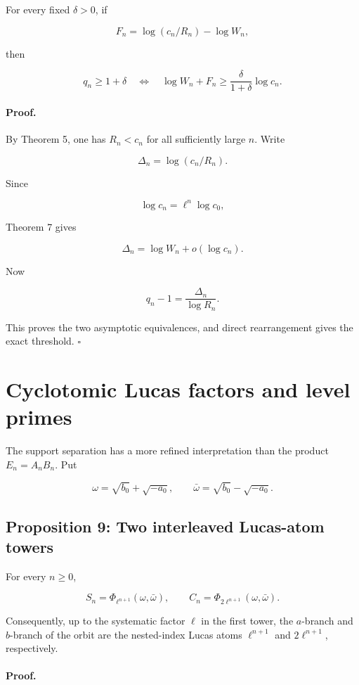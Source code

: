 \documentclass[11pt]{article}
\begin{document}
For every fixed \(\delta>0\), if

\[
F_n
=
\log(c_n/R_n)-\log W_n,
\]

then

\[
q_n\geq1+\delta
\quad\Longleftrightarrow\quad
\log W_n+F_n
\geq
\frac{\delta}{1+\delta}\log c_n.
\]

\paragraph{Proof.}

By Theorem 5, one has \(R_n<c_n\) for all sufficiently large \(n\). Write

\[
\Delta_n
=
\log(c_n/R_n).
\]

Since

\[
\log c_n
=
\ell^n\log c_0,
\]

Theorem 7 gives

\[
\Delta_n
=
\log W_n
+
o(\log c_n).
\]

Now

\[
q_n-1
=
\frac{\Delta_n}{\log R_n}.
\]

This proves the two asymptotic equivalences, and direct rearrangement gives
the exact threshold. \(\square\)

\section{Cyclotomic Lucas factors and level primes}

The support separation has a more refined interpretation than the product
\(E_n=A_nB_n\). Put

\[
\omega
=
\sqrt{b_0}+\sqrt{-a_0},
\qquad
\bar\omega
=
\sqrt{b_0}-\sqrt{-a_0}.
\]

\subsection{Proposition 9: Two interleaved Lucas-atom towers}

For every \(n\geq0\),

\[
S_n
=
\Phi_{\ell^{n+1}}(\omega,\bar\omega),
\qquad
C_n
=
\Phi_{2\ell^{n+1}}(\omega,\bar\omega).
\]

Consequently, up to the systematic factor \(\ell\) in the first tower, the
\(a\)-branch and \(b\)-branch of the orbit are the nested-index Lucas atoms
\(\ell^{n+1}\) and \(2\ell^{n+1}\), respectively.

\paragraph{Proof.}
\end{document}
